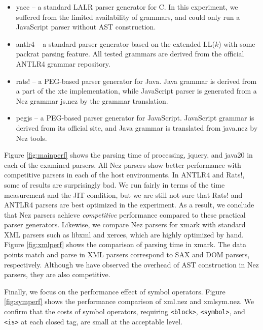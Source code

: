 \documentclass[preprint]{sigplanconf}
\begin{document}
\begin{itemize}

\item {\sf yacc} -- a standard LALR parser generator for C. In this experiment, we suffered from the limited availability of grammars, and could only run a JavaScript parser without AST construction. 

\item {\sf antlr4} -- a standard parser generator based on the extended LL($k$) with some packrat parsing feature. All tested grammars are derived from the official ANTLR4 grammar repository.

\item {\sf rats$!$} -- a PEG-based parser generator\cite{PLDI06_Rats} for Java. Java grammar is derived from a part of the xtc implementation, while JavaScript parser is generated from a Nez grammar {\sf js.nez} by the grammar translation.  

\item {\sf pegjs} -- a PEG-based parser generator\cite{PEGjs} for JavaScript. JavaScript grammar is derived from its official site, and Java grammar is translated from {\sf java.nez} by Nez tools.


\end{itemize}

Figure \ref{fig:mainperf} shows the parsing time of {\sf processing}, {\sf jquery}, and {\sf java20} in each of the examined parsers. All Nez parsers show better performance with competitive parsers in each of the host environments. In ANTLR4 and Rats$!$, some of results are surprisingly bad. We run fairly in terms of the time measurement and the JIT condition, but we are still not sure that Rats$!$ and ANTLR4 parsers are best optimized in the experiment. As a result, we conclude that Nez parsers achieve {\it competitive} performance compared to these practical parser generators. Likewise, we compare Nez parsers for {\sf xmark} with standard XML parsers such as libxml and xerces, which are highly optimized by hand. Figure \ref{fig:xmlperf} shows the comparison of parsing time in {\sf xmark}. The data points {\sf match} and {\sf parse} in XML parsers correspond to SAX and DOM parsers, respectively. Although we have observed the overhead of AST construction in Nez parsers, they are also competitive. 

Finally, we focus on the performance effect of symbol operators. Figure \ref{fig:symperf} shows the performance comparison of {\sf xml.nez} and {\sf xmlsym.nez}. We confirm that the costs of symbol operators, requiring \verb|<block>|, \verb|<symbol>|, and \verb|<is>| at each closed tag, are small at the acceptable level. 
\end{document}
